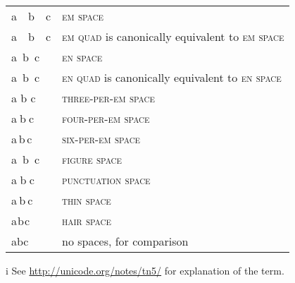 \documentclass{article}
\DeclareRobustCommand{\expl}[1]{\textsf{#1}}
\newcommand{\enquad}{\textsc{en quad}}
\newcommand{\enspaceC}{\textsc{en space}}
\newcommand{\emquad}{\textsc{em quad}}
\newcommand{\emspaceC}{\textsc{em space}}
\newcommand{\threePerEm}{\textsc{three-per-em space}}
\newcommand{\fourPerEm}{\textsc{four-per-em space}}
\newcommand{\sixPerEm}{\textsc{six-per-em space}}
\newcommand{\figuresp}{\textsc{figure space}}
\newcommand{\punctsp}{\textsc{punctuation space}}
\newcommand{\thinsp}{\textsc{thin space}}
\newcommand{\hairsp}{\textsc{hair space}}
\begin{document}
\begin{center}
\begin{threeparttable}
\begin{tabular}[c]{l | >{\raggedright}p{}}
  a b c & \expl{\emspaceC{}}\tabularnewline
  a b c & \expl{\emquad{} is canonically equivalent{\tnote{i} } to \emspaceC{}}\tabularnewline
  a b c & \expl{\enspaceC{}}\tabularnewline
  a b c & \expl{\enquad{} is canonically equivalent{\tnote{i} } to \enspaceC{}}\tabularnewline
  a b c & \expl{\threePerEm{}}\tabularnewline
  a b c & \expl{\fourPerEm{}}\tabularnewline
  a b c & \expl{\sixPerEm{}}\tabularnewline
  a b c & \expl{\figuresp{}}\tabularnewline
  a b c & \expl{\punctsp{}}\tabularnewline
  a b c & \expl{\thinsp{}}\tabularnewline
  a b c & \expl{\hairsp{}}\tabularnewline
  abc   & \expl{no spaces, for comparison}\tabularnewline
\end{tabular}
\begin{tablenotes}
\item[\expl{i}] \expl{\footnotesize See \url{http://unicode.org/notes/tn5/}
    for explanation of the term.}
\end{tablenotes}
\end{threeparttable}
\end{center}

\pagebreak
\end{document}
